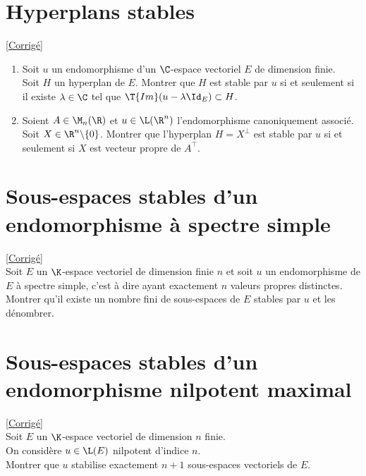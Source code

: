 \documentclass[8pt]{book}
\begin{document}
	\section{Hyperplans stables}
	\label{Hyperplans stables}
	\textcolor{blue}{\hyperref[Hyperplans stables corrigé]{[Corrigé]}}\\
	\begin{enumerate}[leftmargin=*]
		\item Soit $u$ un endomorphisme d'un $\C$-espace vectoriel $E$ de dimension finie.\\
		Soit $H$ un hyperplan de $E$. Montrer que $H$ est stable par $u$ si et seulement si il existe $\lambda\in \C$ tel que $\T{Im}(u-\lambda\Id_E)\subset H$.
		\item Soient $A\in \M_n(\R)$ et $u\in \L(\R^n)$ l'endomorphisme canoniquement associé.\\
		Soit $X\in \R^n\backslash\{0\}$. Montrer que l'hyperplan $H=X^\bot$ est stable par $u$ si et seulement si $X$ est vecteur propre de $A^\top$.
	\end{enumerate}
	
	\section{Sous-espaces stables d'un endomorphisme à spectre simple }
	\label{Sous-espaces stables d'un endomorphisme à spectre simple}
	\textcolor{blue}{\hyperref[Sous-espaces stables d'un endomorphisme à spectre simple corrigé]{[Corrigé]}}\\
	Soit $E$ un $\K$-espace vectoriel de dimension finie $n$ et soit $u$ un endomorphisme de $E$ à spectre simple, c'est à dire ayant exactement $n$ valeurs propres distinctes.\\
	Montrer qu'il existe un nombre fini de sous-espaces de $E$ stables par $u$ et les dénombrer.
	
	\section{Sous-espaces stables d'un endomorphisme nilpotent maximal }
	\label{Sous-espaces stables d'un endomorphsime nilpotent maximal}
	\textcolor{blue}{\hyperref[Sous-espaces stables d'un endomorphisme nilpotent maximal corrigé]{[Corrigé]}}\\
	Soit $E$ un $\K$-espace vectoriel de dimension $n$ finie.\\ On considère $u\in \L(E)$ nilpotent d'indice $n$.\\
	Montrer que $u$ stabilise exactement $n+1$ sous-espaces vectoriels de $E$.
	
\end{document}
